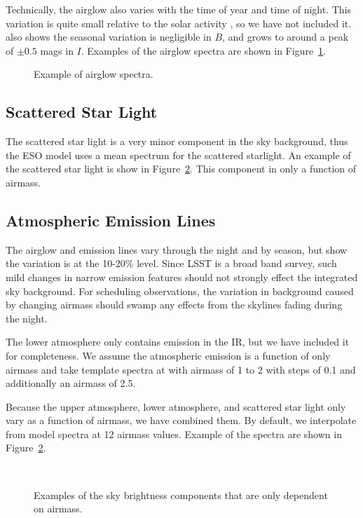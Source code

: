 \documentclass{emulateapj}  %
\begin{document}
Technically, the airglow also varies with the time of year and time of night.  This variation is quite small relative to the solar activity \citep{Noll12}, so we have not included it.  \citet{Patat08} also shows the seasonal variation is negligible in $B$, and grows to around a peak of $\pm0.5$ mags in $I$. Examples of the airglow spectra are shown in Figure~\ref{fig:airglow}.

\begin{figure}
  \caption{Example of airglow spectra. \label{fig:airglow}}
\end{figure}

  

\subsection{Scattered Star Light}

The scattered star light is a very minor component in the sky background, thus the ESO model uses a mean spectrum for the scattered starlight.  An example of the scattered star light is show in Figure~\ref{fig:merged}. This component in only a function of airmass.


\subsection{Atmospheric Emission Lines}

The airglow and emission lines vary through the night and by season, but \citet{Noll12} show the variation is at the 10-20\% level.  Since LSST is a broad band survey, such mild changes in narrow emission features should not strongly effect the integrated sky background.  For scheduling observations, the variation in background caused by changing airmass should swamp any effects from the skylines fading during the night.

The lower atmosphere only contains emission in the IR, but we have included it for completeness.  We assume the atmospheric emission is a function of only airmass and take template spectra at with airmass of 1 to 2 with steps of 0.1 and additionally an airmass of 2.5.

Because the upper atmosphere, lower atmosphere, and scattered star light only vary as a function of airmass, we have combined them. By default, we interpolate from model spectra at 12 airmass values.  Example of the spectra are shown in Figure~\ref{fig:merged}.


\begin{figure}
   \\
  \caption{Examples of the sky brightness components that are only dependent on airmass. \label{fig:merged}}
\end{figure}
\end{document}
